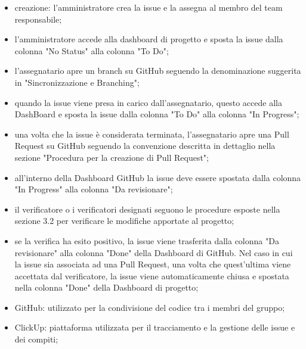 \begin{itemize}
	\item creazione: l’amministratore crea la issue e la assegna al membro del team responsabile;
	\item l’amministratore accede alla dashboard di progetto e sposta la issue dalla colonna "No Status" alla colonna "To Do";
	\item l’assegnatario apre un branch su GitHub seguendo la denominazione suggerita in "Sincronizzazione e Branching";
	\item quando la issue viene presa in carico dall’assegnatario, questo accede alla DashBoard e sposta la issue dalla colonna "To Do" alla colonna "In Progress";
	\item una volta che la issue è considerata terminata, l’assegnatario apre una Pull Request su GitHub seguendo la convenzione descritta in dettaglio nella sezione "Procedura per la creazione di Pull Request";
	\item all’interno della Dashboard GitHub la issue deve essere spostata dalla colonna "In Progress" alla colonna "Da revisionare";
	\item il verificatore o i verificatori designati seguono le procedure esposte nella sezione 3.2 per verificare le modifiche apportate al progetto;
	\item se la verifica ha esito positivo, la issue viene trasferita dalla colonna "Da revisionare" alla colonna "Done" della Dashboard di GitHub. Nel caso in cui la issue sia associata ad una Pull Request, una volta che quest’ultima viene accettata dal verificatore, la issue viene automaticamente chiusa e spostata nella colonna "Done" della Dashboard di progetto;
\end{itemize}
\begin{itemize}
	\item GitHub: utilizzato per la condivisione del codice tra i membri del gruppo;
	\item ClickUp: piattaforma utilizzata per il tracciamento e la gestione delle issue e dei compiti;
\end{itemize}
